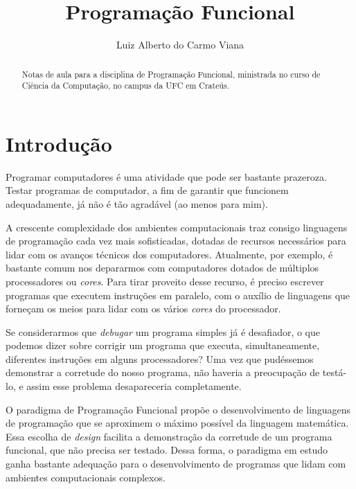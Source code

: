 \documentclass[a4paper]{article}
\begin{document}
\title{Programação Funcional}
\author{Luiz Alberto do Carmo Viana}

\maketitle

\begin{abstract}
	Notas de aula para a disciplina de Programação Funcional, ministrada no curso de Ciência da Computação, no campus da UFC em Crateús.
\end{abstract}

\tableofcontents

\pagebreak

\section{Introdução}

Programar computadores é uma atividade que pode ser bastante prazeroza.
Testar programas de computador, a fim de garantir que funcionem adequadamente,
já não é tão agradável (ao menos para mim).

A crescente complexidade dos ambientes computacionais traz consigo linguagens de
programação cada vez mais sofisticadas, dotadas de recursos necessários para
lidar com os avanços técnicos dos computadores.
Atualmente, por exemplo, é bastante comum nos depararmos com computadores
dotados de múltiplos processadores ou \emph{cores}.
Para tirar proveito desse recurso, é preciso escrever programas que executem
instruções em paralelo, com o auxílio de linguagens que forneçam os meios para
lidar com os vários \emph{cores} do processador.

Se considerarmos que \emph{debugar} um programa simples já é desafiador, o que
podemos dizer sobre corrigir um programa que executa, simultaneamente,
diferentes instruções em alguns processadores?
Uma vez que pudéssemos demonstrar a corretude do nosso programa, não haveria a
preocupação de testá-lo, e assim esse problema desapareceria completamente.

O paradigma de Programação Funcional propõe o desenvolvimento de linguagens de
programação que se aproximem o máximo possível da linguagem matemática.
Essa escolha de \emph{design} facilita a demonstração da corretude de um
programa funcional, que não precisa ser testado.
Dessa forma, o paradigma em estudo ganha bastante adequação para o
desenvolvimento de programas que lidam com ambientes computacionais complexos.
\end{document}
